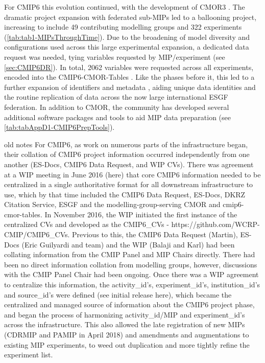 \documentclass[manuscript]{copernicus}
\begin{document}
{For CMIP6 this evolution continued, with the development of CMOR3 \citep{mauzey_cmor_2024}. The dramatic project expansion with federated sub-MIPs led to a ballooning project, increasing to include 49 contributing modelling groups and 322 experiments (\autoref{tab:tab1-MIPsThroughTime}). Due to the broadening of model diversity and configurations used across this large experimental expansion, a dedicated data request was needed, tying variables requested by MIP/experiment (see \autoref{sec:CMIP6DR}). In total, 2062 variables were requested across all experiments, encoded into the CMIP6-CMOR-Tables \citep{nadeau_cmip6_2017}. Like the phases before it, this led to a further expansion of identifiers and metadata \citep{taylor_pcmdi_2018}, aiding unique data identities and the routine replication of data across the now large international ESGF federation. In addition to CMOR, the community has developed several additional software packages and tools to aid MIP data preparation (see \autoref{tab:tabAppD1-CMIP6PrepTools}).

old notes
For CMIP6, as work on numerous parts of the infrastructure began, their collation of CMIP6 project information occurred independently from one another (ES-Docs, CMIP6 Data Request, and WIP CVs). There was agreement at a WIP meeting in June 2016 (here) that core CMIP6 information needed to be centralized in a single authoritative format for all downstream infrastructure to use, which by that time included the CMIP6 Data Request, ES-Docs, DKRZ Citation Service, ESGF and the modelling-group-serving CMOR and cmip6-cmor-tables. In November 2016, the WIP initiated the first instance of the centralized CVs and developed as the CMIP6_CVs - https://github.com/WCRP-CMIP/CMIP6_CVs. Previous to this, the CMIP6 Data Request (Martin), ES-Docs (Eric Guilyardi and team) and the WIP (Balaji and Karl) had been collating information from the CMIP Panel and MIP Chairs directly. There had been no direct information collation from modelling groups, however, discussions with the CMIP Panel Chair had been ongoing. Once there was a WIP agreement to centralize this information, the activity_id’s, experiment_id’s, institution_id’s and source_id’s were defined (see initial release here), which became the centralized and managed source of information about the CMIP6 project phase, and began the process of harmonizing activity_id/MIP and experiment_id’s across the infrastructure. This also allowed the late registration of new MIPs (CDRMIP and PAMIP in April 2018) and amendments and augmentations to existing MIP experiments, to weed out duplication and more tightly refine the experiment list.

}
\end{document}
